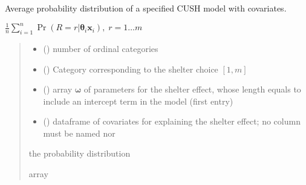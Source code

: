 \documentclass[letterpaper,10pt,english]{sphinxmanual}
\begin{document}
\begin{fulllineitems}
\label{\detokenize{cubmods:cubmods.cush_x.pmf}}
\pysigstartsignatures
{}
\pysigstopsignatures
\sphinxAtStartPar
Average probability distribution of a specified CUSH model with covariates.

\sphinxAtStartPar
\(\frac{1}{n} \sum_{i=1}^n \Pr(R = r | \pmb\theta_i \pmb x_i),\; r=1 \ldots m\)
\begin{quote}\begin{description}
\begin{itemize}
\item {} 
\sphinxAtStartPar
{} () \textendash{} number of ordinal categories

\item {} 
\sphinxAtStartPar
{} () \textendash{} Category corresponding to the shelter choice \([1,m]\)

\item {} 
\sphinxAtStartPar
{} () \textendash{} array \(\pmb \omega\) of parameters for the shelter effect, whose length equals 
 to include an intercept term in the model (first entry)

\item {} 
\sphinxAtStartPar
{} () \textendash{} dataframe of covariates for explaining the shelter effect;
no column must be named  nor 

\end{itemize}

\sphinxAtStartPar
the probability distribution

\sphinxAtStartPar
array

\end{description}\end{quote}

\end{fulllineitems}
\end{document}
